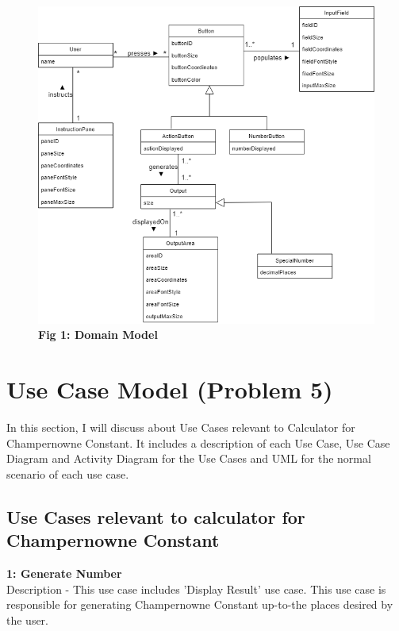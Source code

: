 \documentclass[paper=a4, fontsize=11pt]{report}
\numberwithin{equation}{section}		%
\numberwithin{figure}{section}			%
\numberwithin{table}{section}				%
\begin{document}
\pagebreak
\begin{figure}[htp]
    \centering
    \vspace{2cm}
    \includegraphics[width=15cm]{DomainModel.png}
    \caption*{\textbf{Fig 1: Domain Model}}
\end{figure}
\pagebreak


\chapter{Use Case Model (Problem 5)}
In this section, I will discuss about Use Cases relevant to Calculator for Champernowne Constant. \newline
It includes a description of each Use Case, \gls{Use Case Diagram} and \gls{Activity Diagram} for the Use Cases and UML for the normal scenario of each use case.
  
\section{Use Cases relevant to calculator for Champernowne Constant  }

\begin{flushleft}
\textbf{1: Generate Number }
\\Description - This use case includes 'Display Result' use case. This use case is responsible for generating Champernowne Constant up-to-the places desired by the user.
\end{flushleft}
\end{document}
